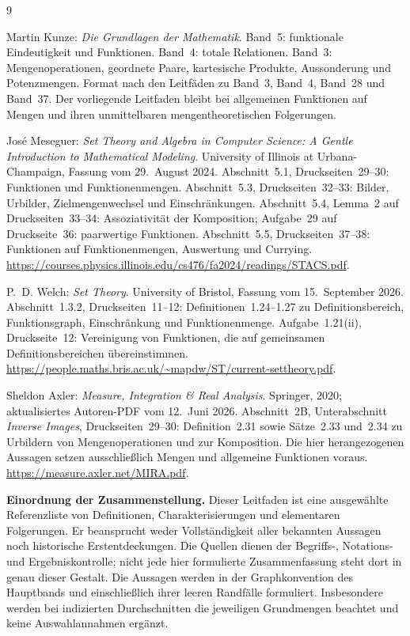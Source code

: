\renewcommand{\bibname}{Quellen und Bandzuordnung}
\begin{thebibliography}{9}
\footnotesize
\setlength{\itemsep}{4pt}
\setlength{\parskip}{0pt}

Martin Kunze: \emph{Die Grundlagen der Mathematik}.
Band~5: funktionale Eindeutigkeit und Funktionen.
Band~4: totale Relationen.
Band~3: Mengenoperationen, geordnete Paare, kartesische Produkte,
Aussonderung und Potenzmengen.
Format nach den Leitfäden zu Band~3, Band~4, Band~28 und Band~37.
Der vorliegende Leitfaden bleibt bei allgemeinen Funktionen
auf Mengen und ihren unmittelbaren mengentheoretischen Folgerungen.

José Meseguer: \emph{Set Theory and Algebra in Computer Science:
A Gentle Introduction to Mathematical Modeling}.
University of Illinois at Urbana-Champaign, Fassung vom
29.~August 2024.
Abschnitt~5.1, Druckseiten~29--30: Funktionen und Funktionenmengen.
Abschnitt~5.3, Druckseiten~32--33: Bilder, Urbilder,
Zielmengenwechsel und Einschränkungen.
Abschnitt~5.4, Lemma~2 auf Druckseiten~33--34:
Assoziativität der Komposition;
Aufgabe~29 auf Druckseite~36: paarwertige Funktionen.
Abschnitt~5.5, Druckseiten~37--38: Funktionen auf Funktionenmengen,
Auswertung und Currying.
\url{https://courses.physics.illinois.edu/cs476/fa2024/readings/STACS.pdf}.

P.~D. Welch: \emph{Set Theory}.
University of Bristol, Fassung vom 15.~September 2026.
Abschnitt~1.3.2, Druckseiten~11--12:
Definitionen~1.24--1.27 zu Definitionsbereich, Funktionsgraph,
Einschränkung und Funktionenmenge.
Aufgabe~1.21(ii), Druckseite~12:
Vereinigung von Funktionen, die auf gemeinsamen
Definitionsbereichen übereinstimmen.
\url{https://people.maths.bris.ac.uk/~mapdw/ST/current-settheory.pdf}.

Sheldon Axler: \emph{Measure, Integration \& Real Analysis}.
Springer, 2020; aktualisiertes Autoren-PDF vom 12.~Juni 2026.
Abschnitt~2B, Unterabschnitt \emph{Inverse Images},
Druckseiten~29--30: Definition~2.31 sowie Sätze~2.33 und~2.34
zu Urbildern von Mengenoperationen und zur Komposition.
Die hier herangezogenen Aussagen setzen ausschließlich
Mengen und allgemeine Funktionen voraus.
\url{https://measure.axler.net/MIRA.pdf}.

\end{thebibliography}

\noindent\textbf{Einordnung der Zusammenstellung.}
Dieser Leitfaden ist eine ausgewählte Referenzliste von Definitionen,
Charakterisierungen und elementaren Folgerungen.
Er beansprucht weder Vollständigkeit aller bekannten Aussagen
noch historische Erstentdeckungen.
Die Quellen dienen der Begriffs-, Notations- und Ergebniskontrolle;
nicht jede hier formulierte Zusammenfassung steht dort
in genau dieser Gestalt.
Die Aussagen werden in der Graphkonvention des Hauptbands
und einschließlich ihrer leeren Randfälle formuliert.
Insbesondere werden bei indizierten Durchschnitten die jeweiligen
Grundmengen beachtet und keine Auswahlannahmen ergänzt.
